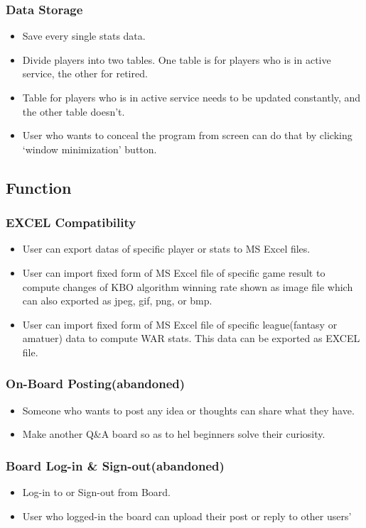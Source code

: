 \documentclass[conference,compsoc, twocolumn]{IEEEtran}
\begin{document}
\subsubsection{Data Storage}
\begin{itemize}
\item Save every single stats data.
\item Divide players  into two tables. One table is for players who is in active service, the other for retired.
\item Table for players who is in active service needs to be updated constantly, and the other table doesn’t.
\item User who wants to conceal  the program from screen can do that by clicking ‘window minimization’ button.
\end{itemize}

\subsection{Function}


\subsubsection{EXCEL Compatibility}
\begin{itemize}
\item User can export datas of specific player or stats  to MS Excel files.
\item User can import fixed form of MS Excel file of specific game result to compute changes of KBO algorithm winning rate shown as image file which can also exported as jpeg, gif, png, or bmp.
\item User can import fixed form of MS Excel file of specific league(fantasy or amatuer) data to compute WAR stats. This data can be exported as EXCEL file.
\end{itemize}

\subsubsection{On-Board Posting(abandoned)}
\begin{itemize}
\item Someone who wants to post any idea or thoughts can share what they have.
\item Make another Q\&A board so as to hel beginners solve their curiosity.
\end{itemize}

\subsubsection{Board Log-in \& Sign-out(abandoned)}
\begin{itemize}
\item Log-in to or Sign-out from Board.
\item User who logged-in the board can upload their post or reply to other users’
\end{itemize}
\end{document}
